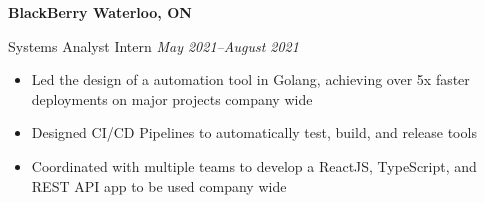 \textbf{BlackBerry \hfill Waterloo, ON}

Systems Analyst Intern \hfill \textit{May 2021--August 2021}
\begin{itemize}
    \item Led the design of a automation tool in Golang, achieving over 5x faster deployments on major projects company wide
    \item Designed CI\slash CD Pipelines to automatically test, build, and release tools
    \item Coordinated with multiple teams to develop a ReactJS, TypeScript, and REST API app to be used company wide
\end{itemize}
